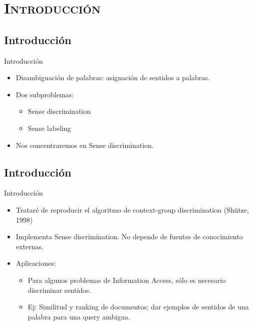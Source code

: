 \documentclass[xcolor=x11names,compress]{beamer}
\renewcommand{\(}{\begin{columns}}
\renewcommand{\)}{\end{columns}}
\newcommand{\<}[1]{\begin{column}{#1}}
\renewcommand{\>}{\end{column}}
\begin{document}
\section{\scshape Introducción}
\subsection{Introducción}
\begin{frame}{Introducción}
\begin{itemize}
\item Disambiguación de palabras: asignación de sentidos a palabras.
\item Dos subproblemas:
\begin{itemize}
\item Sense discrimination
\item Sense labeling
\end{itemize}
\item Nos concentraremos en Sense discrimination.
\end{itemize}
\end{frame}
\subsection{Introducción}
\begin{frame}{Introducción}
\begin{itemize}
\item Trataré de reproducir el algoritmo de context-group discrimination (Shütze, 1998)
\item Implementa Sense discrimination. No depende de fuentes de conocimiento externas.
\item Aplicaciones:
\begin{itemize}
\item Para algunos problemas de Information Access, sólo es necesario discriminar sentidos.
\item Ej: Similitud y ranking de documentos; dar ejemplos de sentidos de una palabra para una query ambigua.
\end{itemize}
\end{itemize}
\end{frame}
\end{document}
